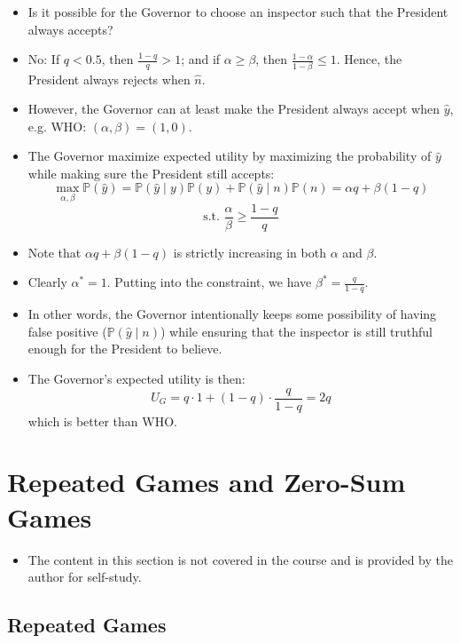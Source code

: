 \documentclass[notitlepage]{article}
\begin{document}
\begin{itemize}
\begin{itemize}
    \item Is it possible for the Governor to choose an inspector such that the President always accepts?
    \item No: If \(q < 0.5\), then \(\frac{1-q}{q} > 1\); and if \(\alpha \ge \beta\), then \(\frac{1-\alpha}{1-\beta} \le 1\). Hence, the President always rejects when \(\hat{n}\).

    \item However, the Governor can at least make the President always accept when \(\hat{y}\), e.g. WHO: \((\alpha,\beta)=(1,0)\).

    \item The Governor maximize expected utility by maximizing the probability of \(\hat{y}\) while making sure the President still accepts:
    \[
    \max_{\alpha,\beta} \mathbb{P}(\hat{y}) = \mathbb{P}(\hat{y} \mid y) \mathbb{P}(y) + \mathbb{P}(\hat{y} \mid n)\mathbb{P}(n) = \alpha q + \beta (1-q)
    \]
    \[
    \text{s.t. } \frac{\alpha}{\beta} \ge \frac{1-q}{q}
    \]
    \item Note that \(\alpha q + \beta (1-q)\) is strictly increasing in both \(\alpha\) and \(\beta\).
    \item Clearly \(\alpha^* = 1\). Putting into the constraint, we have \(\beta^* = \frac{q}{1-q}\).
    \item In other words, the Governor intentionally keeps some possibility of having false positive (\(\mathbb{P}(\hat{y}\mid n)\)) while ensuring that the inspector is still truthful enough for the President to believe.
    \item The Governor's expected utility is then:
    \[
    U_G = q \cdot 1 + (1-q) \cdot \frac{q}{1-q} = 2q
    \]
    which is better than WHO.
    \end{itemize}
\end{itemize}

\section{Repeated Games and Zero-Sum Games}

\begin{itemize}
    \item The content in this section is not covered in the course and is provided by the author for self-study.
\end{itemize}

\subsection{Repeated Games}
\end{document}
